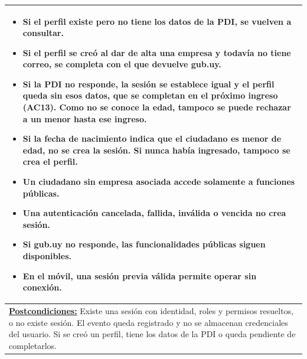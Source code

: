 \begin{table}[H]
\begin{tabular}{|p{15.8cm}|}
\begin{itemize}[leftmargin=*,topsep=2pt,itemsep=1pt,parsep=0pt,partopsep=0pt]
    \item Si el perfil existe pero no tiene los datos de la PDI, se vuelven a consultar.
    \item Si el perfil se creó al dar de alta una empresa y todavía no tiene correo, se completa con el que devuelve gub.uy.
    \item Si la PDI no responde, la sesión se establece igual y el perfil queda sin esos datos, que se completan en el próximo ingreso (AC13). Como no se conoce la edad, tampoco se puede rechazar a un menor hasta ese ingreso.
    \item Si la fecha de nacimiento indica que el ciudadano es menor de edad, no se crea la sesión. Si nunca había ingresado, tampoco se crea el perfil.
    \item Un ciudadano sin empresa asociada accede solamente a funciones públicas.
    \item Una autenticación cancelada, fallida, inválida o vencida no crea sesión.
    \item Si gub.uy no responde, las funcionalidades públicas siguen disponibles.
    \item En el móvil, una sesión previa válida permite operar sin conexión.
\end{itemize} \\ \hline
\textbf{\underline{Postcondiciones:}} Existe una sesión con identidad, roles y permisos resueltos, o no existe sesión. El evento queda registrado y no se almacenan credenciales del usuario. Si se creó un perfil, tiene los datos de la PDI o queda pendiente de completarlos. \\ \hline
\end{tabular}
\end{table}

